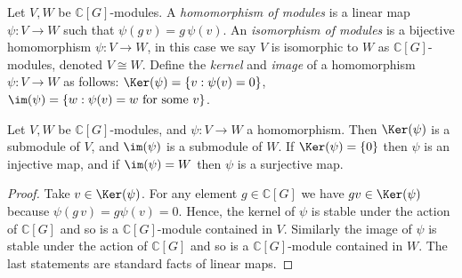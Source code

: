 \documentclass[11pt]{report}
\begin{document}
\begin{defn}
	Let $V,W$ be $\mathbb{C}[G]$-modules. A \emph{homomorphism of modules} is a linear map $\psi:V\to W$ such that $\psi(g \, v) = g \, \psi 
	(v)$. An \emph{isomorphism of modules} is a bijective homomorphism $\psi:V \to W$, in this case we say $V$ is isomorphic to $W$ as $\mathbb{C}[G]$-modules, denoted $V \cong W$.	
	Define the 
	\emph{kernel} and \emph{image} 
	of a homomorphism $\psi:V\to W$ as follows: $\Ker(\psi) = \{v : \psi(v) = 0\}$, $\im(\psi) = \{w : \psi(v) =w \text{ for some $v$}\}$.
\end{defn}

















\begin{lemma}
	\label{chpt3:lem:kerim}
	Let $V,W$ be $\mathbb{C}[G]$-modules, and $\psi:V\to W$ a 
	homomorphism. Then $\Ker(\psi)$ 
	is a submodule of $V$, and $ 
	\im(\psi)$ is 	a submodule of $W$.  If 
	$\Ker(\psi) = \{0\}$ then $\psi$ is an injective map, and if $\im(\psi) = W$ then $\psi$ is a surjective map. 
\end{lemma}

\begin{proof}
	Take $v \in \Ker(\psi)$. For any element $g \in \mathbb{C}[G]$ we have $ gv \in \Ker(\psi)$ because $\psi(g \,v) = g \psi(v) = 0$. Hence, the kernel of $\psi$ is stable under the action of $\mathbb{C}[G]$ and so is a $\mathbb{C}[G]$-module contained in $V$. Similarly the image of $\psi$ is stable under the action of $\mathbb{C}[G]$ and so is a $\mathbb{C}[G]$-module contained in $W$. The last statements are standard facts of linear maps.
\end{proof}
\end{document}
